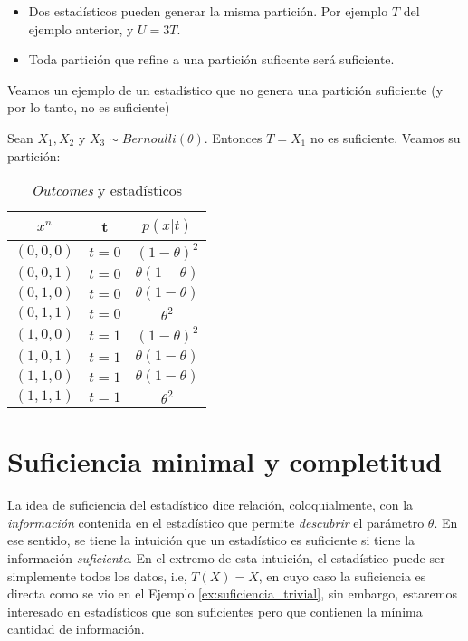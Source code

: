 \begin{remark}
\begin{itemize}
    \item Dos estadísticos pueden generar la misma partición. Por ejemplo $T$ del ejemplo anterior, y $U= 3 T$. 
    \item Toda partición que refine a una partición suficente será suficiente. 
\end{itemize}
\end{remark}
Veamos un ejemplo de un estadístico que no genera una partición suficiente (y por lo tanto, no es suficiente)
\begin{example}
Sean $X_1,X_2$ y $X_3 \sim Bernoulli(\theta)$. Entonces $T=X_1$ no es suficiente. Veamos su partición: 
\begin{table}[h]
    \centering
    \begin{tabular}{c  c  c}  
        $x^{n} $  & t  & $ p(x|t) $\\ \hline
        $ (0,0,0) $ & $t=0$ & $(1-\theta)^2$ \\  
       $ (0,0,1) $ & $t= 0$ & $\theta(1-\theta)$   \\
        $ (0,1,0) $ & $t=0$ & $\theta(1-\theta)$ \\
        $ (0,1,1) $ & $t=0$ & $\theta^2$   \\ \hline 
        $ (1,0,0) $  & $t=1$ & $(1-\theta)^2$ \\  
        $ (1,0,1) $ & $t=1$ & $\theta(1-\theta)$ \\
        $ (1,1,0) $  & $t=1$ & $\theta(1-\theta)$ \\ 
        $ (1,1,1) $ & $t= 1$ & $\theta^2$ \\
        
        
    \end{tabular}
    \caption{\emph{Outcomes} y estadísticos  }
\end{table}

\end{example}


\section{Suficiencia minimal y completitud}
La idea de suficiencia del estadístico dice relación, coloquialmente, con la \textit{información} contenida en el estadístico que permite \textit{descubrir} el parámetro $\theta$. En ese sentido, se tiene la intuición que un estadístico es suficiente si tiene la información \textit{suficiente}. En el extremo de esta intuición, el estadístico puede ser simplemente todos los datos, i.e, $T(X)=X$, en cuyo caso la suficiencia es directa como se vio en el Ejemplo \ref{ex:suficiencia_trivial}, sin embargo, estaremos interesado en estadísticos que son suficientes pero que contienen la mínima cantidad de información.\\ 

